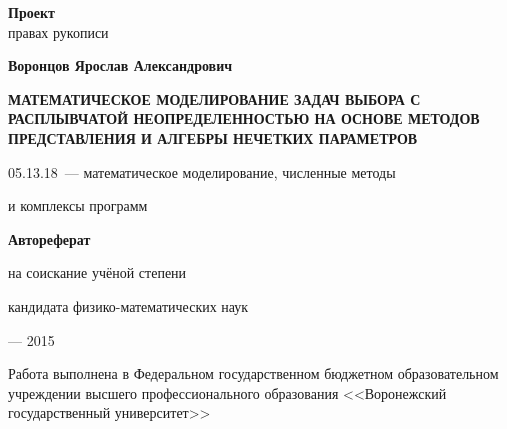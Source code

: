 \newcommand{\sfs}{\fontsize{14pt}{15pt}\selectfont}
\sfs %
\thispagestyle{empty}

\vspace{10mm}
\begin{flushright}
  \textbf{Проект}\\
   правах рукописи
\end{flushright}

\vspace{15mm}
\begin{center}
{\Large\bf Воронцов Ярослав Александрович}
\end{center}

\vspace{15mm}
\begin{center}
{\bf \LARGE \MakeUppercase {Математическое моделирование задач выбора с расплывчатой неопределенностью на основе методов представления и алгебры нечетких параметров}
\par}

\vspace{30mm}
{\Large
05.13.18~--- математическое моделирование, численные методы\par и комплексы программ
}

\vspace{15mm}
\textbf{Автореферат}\par
{} на соискание учёной степени\par
кандидата физико-математических наук
\end{center}

\vspace{40mm}
\begin{center}
{ --- 2015}
\end{center}

\newpage
\thispagestyle{empty}
\noindent Работа выполнена в Федеральном государственном бюджетном образовательном учреждении высшего профессионального образования <<Воронежский государственный университет>>

